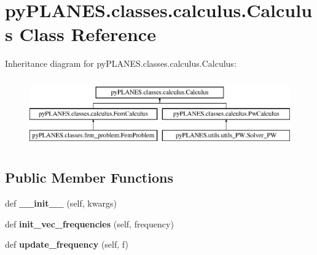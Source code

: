 \hypertarget{classpy_p_l_a_n_e_s_1_1classes_1_1calculus_1_1_calculus}{}\section{py\+P\+L\+A\+N\+E\+S.\+classes.\+calculus.\+Calculus Class Reference}
\label{classpy_p_l_a_n_e_s_1_1classes_1_1calculus_1_1_calculus}
Inheritance diagram for py\+P\+L\+A\+N\+E\+S.\+classes.\+calculus.\+Calculus\+:\begin{figure}[H]
\begin{center}
\leavevmode
\includegraphics[height=3.000000cm]{classpy_p_l_a_n_e_s_1_1classes_1_1calculus_1_1_calculus}
\end{center}
\end{figure}
\subsection*{Public Member Functions}
\begin{DoxyCompactItemize}
\item 
\mbox{\label{classpy_p_l_a_n_e_s_1_1classes_1_1calculus_1_1_calculus_a51fbbe939af1d9eaf6e9a36e34185d03}} 
def {\bfseries \+\_\+\+\_\+init\+\_\+\+\_\+} (self, kwargs)
\item 
\mbox{\label{classpy_p_l_a_n_e_s_1_1classes_1_1calculus_1_1_calculus_a887324122805b6064c66ae530f92ad44}} 
def {\bfseries init\+\_\+vec\+\_\+frequencies} (self, frequency)
\item 
\mbox{\label{classpy_p_l_a_n_e_s_1_1classes_1_1calculus_1_1_calculus_a939a153600c0a125e28a221911a03071}} 
def {\bfseries update\+\_\+frequency} (self, f)
\end{DoxyCompactItemize}
